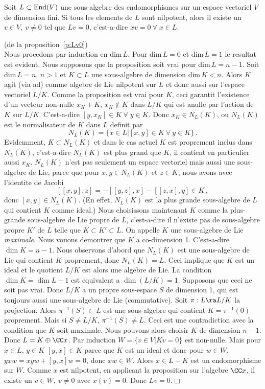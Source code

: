 \begin{ppp}\label{p:Lv0} Soit $L \subset {\rm End}(V)$ une sous-algebre des endomorphismes 
sur un espace vectoriel $V$ de dimension fini. Si tous les elements de $L$ sont nilpotent, 
alors il existe un $v\in V,~ v\neq 0$ tel que $L v =0$, c'est-a-dire $xv=0 ~\forall\; x\in L$.
\end{ppp}

\begin{prv}(de la proposition~\ref{p:Lv0})\\
Nous procedons par induction en dim$\,L$. Pour dim$\,L=0$ et dim$\,L=1$ le resultat est evident.
Nous supposons que la proposition soit vrai pour dim$\,L=n-1$. Soit dim$\,L=n$, $n>1$ et $ K\subset L$ une
sous-algebre de dimension dim$\, K <n$. Alors $ K$ agit (via ad) comme algebre de Lie nilpotent sur $L$
et donc aussi sur l'espace vectoriel $L/ K$. Comme la proposition est vrai pour $ K$, ceci garantit l'existence d'un vecteur non-nulle $x_K+ K$, $x_K\not\in K$ dans $L/ K$ qui est anulle par l'action de $ K$ sur $L/ K$. 
C'est-a-dire $[y,x_K]\in  K~\forall\; y\in  K$.  Donc $x_K\in N_L( K)$, ou $N_L( K)$ est le normalisateur de $ K$ dans $L$ definit par
$$  N_L( K) =\{x\in L| [x,y] \in  K ~ \forall\: y\in K\} \,.$$
Evidemment, $ K\subset N_L( K)$ et dans le cas actuel $ K$ est proprement inclus dans $N_L( K)$, 
c'est-a-dire $N_L( K)$ est plus grand que $ K$, il contient en particulier aussi $x_K$. $N_L( K)$ n'est pas seulement un espace vectoriel mais aussi une sous-algebre de Lie, parce que pour $x,y\in N_L( K)$ et
$z\in K$, nous avons avec l'identite de Jacobi
$$ [[x,y],z] = -[[y,z],x] - [[z,x],y] \in  K \,,$$
donc $[x,y]\in N_L( K)$. (En effet, $N_L( K)$ est la plus grande sous-algebre de $L$ qui contient $ K$ 
comme ideal.) Nous choisissons maintenant $ K$ comme la plus-grande sous-algebre de Lie propre de $L$, 
c'est-a-dire il n'existe pas de sous-algebre propre $ K'$ de $L$ telle que $ K\subset  K'\subset L$. 
On appelle $ K$ une sous-algebre de Lie {\em maximale}.
Nous vouons demontrer que $ K$ a co-dimension 1. C'est-a-dire $\dim K =n-1$. Nous observons d'abord que
$N_L( K)$ est une sous-algebre de Lie qui contient $ K$ proprement, donc $N_L( K)=L$. Ceci implique 
que $ K$ est un ideal et le quotient $L/ K$ est alors une algebre de Lie.  La condition $\dim K =\dim L-1$ est equivalent a $\dim(L/ K) = 1$. Supposons que ceci ne soit pas vrai. Donc $L/ K$ a un propre sous-espace $S$
de dimension 1, qui est toujours aussi une sous-algebre de Lie (commutative). Soit  $\pi :L \ra L/ K$ la projection. Alors $\pi^{-1}(S) \subset L$ est une sous-algebre qui contient $ K=\pi^{-1}(0)$ proprement. Mais si $S\neq L/ K$,
$\pi^{-1}(S) \neq L$. Ceci est une contradiction avec la condition que $ K$ soit maximale.
Nous pouvons alors choisir $ K$ de dimension $n-1$. Donc $L = K \oplus \CC x$. 
Par induction $W =\{v\in V| Kv=0\}$ est non-nulle. Mais pour $x\in L$, $y\in K$ $[y,x]\in K$ parce que $ K$ 
est un ideal et donc pour $w\in W$, $yxw=xyw +[y,x]w =0$,
donc $xw\in W$. Alors $x\in L- K$ est un endomorphisme sur $W$. Comme $x$ est nilpotent, en applicant
la proposition sur l'algebre $\CC x$, 
il existe  un $v\in W,~ v\neq 0$ avec $x(v)=0$.
Donc $L v=0$.\hfill $\Box$
\end{prv}

